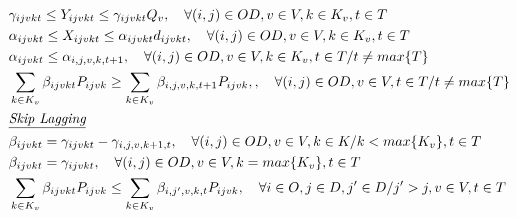 \begin{align}
	 & \gamma_{ijvkt} \leq Y_{ijvkt} \leq \gamma_{ijvkt} Q_v, \quad  \forall (i,j)\in OD, v \in V, k \in K_v, t \in T                                                                                                       \label{eq: m1_activ_bin_autho}                                                 \\
	 & \alpha_{ijvkt} \leq X_{ijvkt} \leq \alpha_{ijvkt}d_{ijvkt}, \quad   \forall(i,j) \in OD, v \in V, k \in K_v, t \in T                                                                                                  \label{eq: m1_binaria_alpha}                                                                               \\
	 & \alpha_{ijvkt} \leq \alpha_{i,j,v,k,t+1}, \quad   \forall(i,j) \in OD, v \in V, k \in K_v, t \in T/ t \neq max\{T\}                                                                                                   \label{eq: m1_assig_last_periodo}                                                                              \\
	 & \sum_{k \in K_v}\beta_{ijvkt}P_{ijvk} \geq \sum_{k \in K_v}\beta_{i,j,v,k,t+1}P_{ijvk},  , \quad   \forall(i,j) \in OD, v \in V, t \in T/ t \neq max\{T\}                                                              \label{eq: m1_fulfill_periodo}                          \\
	 & \textit{\underline{Skip Lagging}}    \notag                                                                                                                                                                                                                                                  \\
	 & \beta_{ijvkt} = \gamma_{ijvkt} - \gamma_{i,j,v,k+1,t}, \quad \forall (i,j) \in OD, v \in V, k \in K /k < max\{K_v\}, t\in T                                                                                               \label{eq: m1_binaria_Beta}             \\                                                                   
	 & \beta_{ijvkt} = \gamma_{ijvkt}, \quad   \forall(i,j) \in OD, v \in V, k = max\{K_v\}, t \in T                                                                                                                         \label{eq: m1_binaria_Beta_last}                                                                           \\
	 & \sum_{k \in K_v}\beta_{ijvkt}P_{ijvk} \leq \sum_{k \in K_v}\beta_{i,j',v,k,t}P_{ijvk}, \quad \forall i \in O, j \in D, j' \in D / j' > j, v \in V, t \in T                                                           \label{eq: m1_preco_estacao_inicio}                                                                              \\

\end{align}
